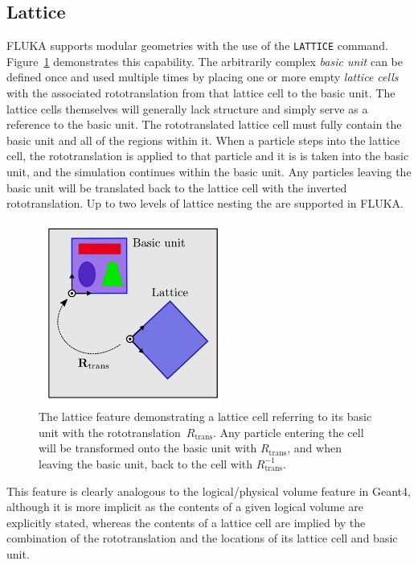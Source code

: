 \documentclass[final,5p,times,twocolumn]{elsarticle}
\newcommand{\fluka}[1]{\texttt{\MakeUppercase{#1}}}
\begin{document}
\subsection{Lattice}

FLUKA supports modular geometries with the use of the \fluka{lattice}
command. Figure~\ref{fig:lattice} demonstrates this capability. The
arbitrarily complex \emph{basic unit} can be defined once and used
multiple times by placing one or more empty \emph{lattice cells} with the
associated rototranslation from that lattice cell to the basic
unit. The lattice cells themselves will generally lack structure
and simply serve as a reference to the basic unit. The rototranslated
lattice cell must fully contain the basic unit and all of the regions
within it. When a particle steps into the lattice cell, the
rototranslation is applied to that particle and it is is taken into the
basic unit, and the simulation continues within the basic unit. Any
particles leaving the basic unit will be translated back to the
lattice cell with the inverted rototranslation. Up to two
levels of lattice nesting the are supported in FLUKA.

\begin{figure}[hbtp]
\begin{center}
\includegraphics[width=6cm]{./diagrams/lattice}
\caption{The lattice feature demonstrating a lattice cell
  referring to its basic unit with the rototranslation~$R_\textrm{trans}$.
  Any particle entering the cell will be transformed onto the basic unit
  with $R_\textrm{trans}$, and when leaving the basic unit, back to the cell
  with $R_\textrm{trans}^{-1}$.}
\label{fig:lattice}
\end{center}
\end{figure}
This feature is clearly analogous to the logical/physical volume feature in
Geant4, although it is more implicit as the contents of a given logical
volume are explicitly stated, whereas the contents of a lattice cell
are implied by the combination of the rototranslation and the locations of
its lattice cell and basic unit.
\end{document}
